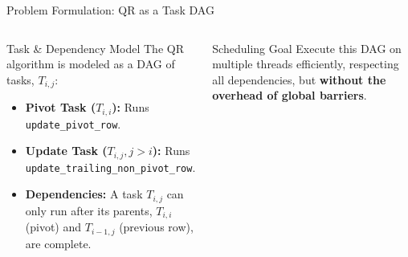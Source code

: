 \begin{frame}{Problem Formulation: QR as a Task DAG}
  \begin{columns}[c,onlytextwidth] 
    \begin{block}{Task \& Dependency Model}
      The QR algorithm is modeled as a DAG of tasks, $T_{i,j}$:
      \begin{itemize}\setlength{\itemsep}{3pt} %
        \item \textbf{Pivot Task ($T_{i,i}$):} Runs \texttt{update\_pivot\_row}.
        \item \textbf{Update Task ($T_{i,j}, j>i$):} Runs \texttt{update\_trailing\_non\_pivot\_row}.
        \item \textbf{Dependencies:} A task $T_{i,j}$ can only run after its parents, \textbf{$T_{i,i}$} (pivot) and \textbf{$T_{i-1,j}$} (previous row), are complete.
      \end{itemize}
    \end{block}

    \begin{alertblock}{Scheduling Goal}
      Execute this DAG on multiple threads efficiently, respecting all dependencies, but \textbf{without the overhead of global barriers}.
    \end{alertblock}
    
    \centering
    
\end{columns}
\end{frame}
